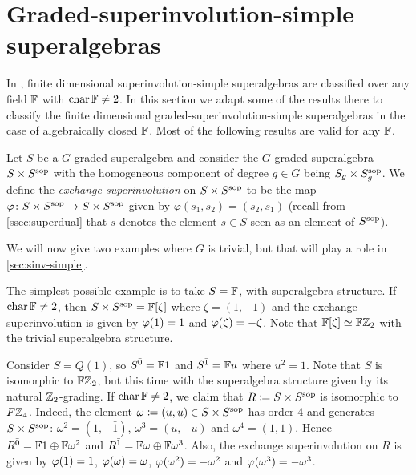 \section{Graded-superinvolution-simple superalgebras}\label{grd-sinv-simple}

In \cite{racine}, finite dimensional superinvolution-simple superalgebras are classified over any field $\mathbb{F}$ with $\operatorname{char} \mathbb{F} \neq 2$. 
In this section we adapt some of the results there to classify the finite dimensional graded-superinvolution-simple superalgebras in the case of algebraically closed $\mathbb{F}$. 
Most of the following results are valid for any $\mathbb{F}$. 

\begin{defi}\label{def:SxSsop}
	Let $S$ be a $G$-graded superalgebra and consider the $G$-graded superalgebra $S \times S^{\mathrm{sop}}$ with the homogeneous component of degree $g\in G$ being $S_g \times S^{\mathrm{sop}}_g$. 
	We define the \emph{exchange superinvolution} on $S \times S^{\mathrm{sop}}$ to be the map $\varphi\colon S \times S^{\mathrm{sop}} \to S \times S^{\mathrm{sop}}$ given by $\varphi (s_1, \bar s_2) = (s_2, \bar s_1)$ (recall from \cref{ssec:superdual} that $\bar s$ denotes the element $s \in S$ seen as an element of $S^{\mathrm{sop}}$). 
\end{defi}

We will now give two examples where $G$ is trivial, but that will play a role in \cref{sec:sinv-simple}. 

\begin{ex}\label{ex:FxF-iso-FZ2}
	The simplest possible example is to take $S = \mathbb{F}$, with superalgebra structure. 
	If $\operatorname{char} \mathbb{F} \neq 2$, then $S\times S^{\mathrm{sop}} = \mathbb{F} [\zeta]$ where $\zeta = (1, -1)$ and the exchange superinvolution is given by $\varphi(1) = 1$ and $\varphi(\zeta) = -\zeta$.
	Note that $\mathbb{F} [\zeta] \simeq \mathbb{F}\mathbb{Z}_2$ with the trivial superalgebra structure. 
\end{ex}

\begin{ex}\label{ex:FZ2xFZ2sop-iso-FZ4}
	Consider $S = Q(1)$, so $S^{\bar0} = \mathbb{F} 1$ and $S^{\bar1} = \mathbb{F} u$ where $u^2 =1$.
	Note that $S$ is isomorphic to $\mathbb{F}\mathbb{Z}_2$, but this time with the superalgebra structure given by its natural $\mathbb{Z}_2$-grading. 
	If $\operatorname{char} \mathbb{F} \neq 2$, we claim that $R \coloneqq S\times S^{\mathrm{sop}}$ is isomorphic to $F\mathbb{Z}_4$.
	Indeed, the element $\omega \coloneqq (u, \bar u) \in S\times S^{\mathrm{sop}}$ has order $4$ and generates $S\times S^{\mathrm{sop}}$: $\omega^2 = (1, - \bar 1)$, $\omega^3 = (u, - \bar u)$ and $\omega^4 = (1, 1)$.
	Hence $R^{\bar0} = \mathbb{F}1 \oplus \mathbb{F} \omega^2$ and $R^{\bar1} = \mathbb{F} \omega \oplus \mathbb{F} \omega^3$.
	Also, the exchange superinvolution on $R$ is given by $\varphi(1) = 1$, $\varphi(\omega) = \omega$, $\varphi(\omega^2) = -\omega^2$ and $\varphi(\omega^3) = -\omega^3$.
\end{ex}

